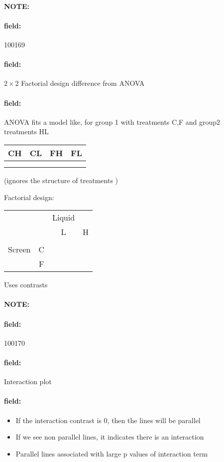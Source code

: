 \documentclass[12pt]{article}
\newenvironment{note}{\paragraph{NOTE:}}{}
\newenvironment{field}{\paragraph{field:}}{}
\begin{document}
\begin{note}
 \begin{field}
  \tiny 100169
 \end{field}
 \begin{field}
  $2\times 2$ Factorial design difference from ANOVA
 \end{field}
 \begin{field}
  ANOVA fits a model like, for group 1 with treatments C,F and group2 treatments HL
  \begin{tabular}{|c |c |c |c |}
   CH & CL & FH & FL \\
   \hline            \\
      &    &    &    \\
   \hline
  \end{tabular}

  (ignores the structure of treatments )

  Factorial design:
  \begin{tabular}{c|c|c|c|}
          &   & Liquid &   \\
          &   & L      & H \\
   \hline                  \\
   Screen & C &        &   \\
          & F &        &   \\
   \hline
  \end{tabular}

  Uses contrasts
 \end{field}
\end{note}


\begin{note}
 \begin{field}
  \tiny 100170
 \end{field}
 \begin{field}
  Interaction plot
 \end{field}
 \begin{field}
  \begin{itemize}
   \item If the interaction contrast is 0, then the lines will be parallel
   \item If we see non parallel lines, it indicates there is an interaction
   \item Parallel lines associated with large p values of interaction term
  \end{itemize}
 \end{field}
\end{note}
\end{document}
